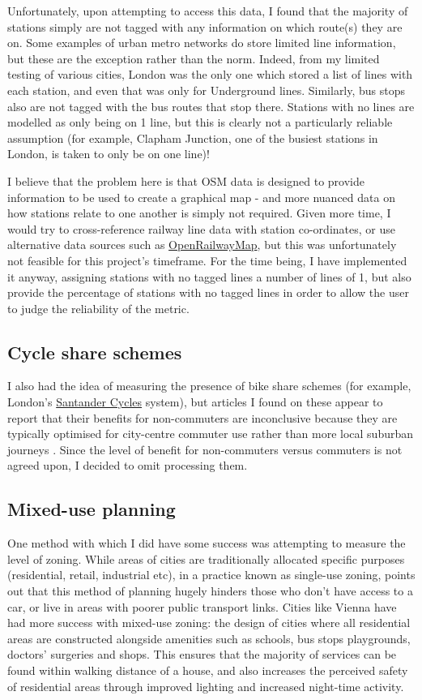 \documentclass[11pt]{article} %
\begin{document}
Unfortunately, upon attempting to access this data, I found that the majority of stations simply are not tagged with any information on which route(s) they are on. Some examples of urban metro networks do store limited line information, but these are the exception rather than the norm. Indeed, from my limited testing of various cities, London was the only one which stored a list of lines with each station, and even that was only for Underground lines. Similarly, bus stops also are not tagged with the bus routes that stop there. Stations with no lines are modelled as only being on 1 line, but this is clearly not a particularly reliable assumption (for example, Clapham Junction, one of the busiest stations in London, is taken to only be on one line)!

I believe that the problem here is that OSM data is designed to provide information to be used to create a graphical map - and more nuanced data on how stations relate to one another is simply not required. Given more time, I would try to cross-reference railway line data with station co-ordinates, or use alternative data sources such as \href{https://www.openrailwaymap.org/}{OpenRailwayMap}, but this was unfortunately not feasible for this project's timeframe. For the time being, I have implemented it anyway, assigning stations with no tagged lines a number of lines of 1, but also provide the percentage of stations with no tagged lines in order to allow the user to judge the reliability of the metric.

\subsection{Cycle share schemes}
I also had the idea of measuring the presence of bike share schemes (for example, London's \href{https://tfl.gov.uk/modes/cycling/santander-cycles}{Santander Cycles} system), but articles I found on these appear to report that their benefits for non-commuters are inconclusive because they are typically optimised for city-centre commuter use rather than more local suburban journeys \parencite{Beecham2014}. Since the level of benefit for non-commuters versus commuters is not agreed upon, I decided to omit processing them.

\subsection{Mixed-use planning}
One method with which I did have some success was attempting to measure the level of zoning. While areas of cities are traditionally allocated specific purposes (residential, retail, industrial etc), in a practice known as single-use zoning, \cite{Perez2019} points out that this method of planning hugely hinders those who don't have access to a car, or live in areas with poorer public transport links. Cities like Vienna have had more success with mixed-use zoning: the design of cities where all residential areas are constructed alongside amenities such as schools, bus stops playgrounds, doctors' surgeries and shops. This ensures that the majority of services can be found within walking distance of a house, and also increases the perceived safety of residential areas through improved lighting and increased night-time activity.
\end{document}
